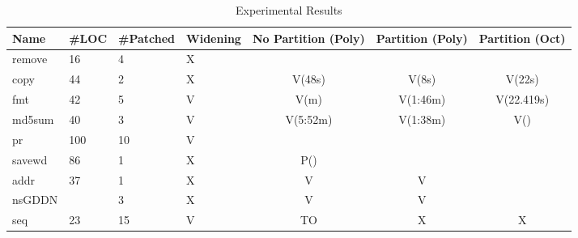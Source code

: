 \begin{table*}[htbp]
  \footnotesize
  \centering
  \caption{Experimental Results}
    \begin{tabular}{llllccc}
    \hline
    \textbf{Name} & \textbf{\#LOC} & \textbf{\#Patched} & \textbf{Widening} &  \textbf{No Partition (Poly)} &  \textbf{Partition (Poly)} &  \textbf{Partition (Oct)} \\
    \hline
              remove    & 16    & 4     & X &  &  &  \\
              copy      & 44    & 2     & X & V(48s)    & V(8s) & V(22s) \\
              fmt       & 42    & 5     & V & V(m)      & V(1:46m) & V(22.419s) \\
              md5sum    & 40    & 3     & V & V(5:52m)  & V(1:38m) & V() \\
              pr        & 100   & 10    & V &  &  &  \\
              savewd    & 86    & 1     & X & P() &  &  \\
              addr      & 37    & 1     & X & V & V &         \\
              nsGDDN    &       & 3     & X & V & V &        \\
              seq       & 23    & 15    & V & TO & X & X  \\              
    \hline
    \end{tabular}%
\end{table*}%